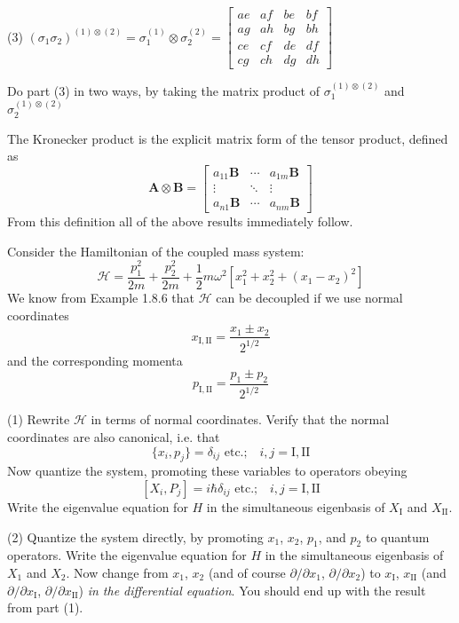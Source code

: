 \documentclass[../principles-of-quantum-mechanics.tex]{subfiles}
\begin{document}
\begin{questions}
		(3) $(\sigma_1\sigma_2)^{(1)\otimes(2)} = \sigma_1^{(1)}\otimes\sigma_2^{(2)} = \begin{bmatrix}ae & af & be & bf \\ ag & ah & bg & bh \\ ce & cf & de & df \\ cg & ch & dg & dh\end{bmatrix}$
		
		Do part (3) in two ways, by taking the matrix product of $\sigma_1^{(1)\otimes(2)}$ and $\sigma_2^{(1)\otimes(2)}$
		
		\begin{solution}
			The Kronecker product is the explicit matrix form of the tensor product, defined as
			$$\mathbf{A}\otimes\mathbf{B} = \begin{bmatrix}a_{11}\mathbf{B} & \cdots & a_{1m}\mathbf{B} \\ \vdots & \ddots & \vdots \\ a_{n1}\mathbf{B} & \cdots & a_{nm}\mathbf{B}\end{bmatrix}$$
			From this definition all of the above results immediately follow.
		\end{solution}
	
		\question Consider the Hamiltonian of the coupled mass system:
		$$\mathcal{H} = \frac{p_1^2}{2m} + \frac{p_2^2}{2m} + \frac{1}{2}m\omega^2[x_1^2 + x_2^2 + (x_1 - x_2)^2]$$
		We know from Example 1.8.6 that $\mathcal{H}$ can be decoupled if we use normal coordinates
		$$x_{\mathrm{I}, \mathrm{II}} = \frac{x_1 \pm x_2}{2^{1/2}}$$
		and the corresponding momenta
		$$p_{\mathrm{I}, \mathrm{II}} = \frac{p_1 \pm p_2}{2^{1/2}}$$
		
		(1) Rewrite $\mathcal{H}$ in terms of normal coordinates. Verify that the normal coordinates are also canonical, i.e. that
		$$\{x_i, p_j\} = \delta_{ij}\text{ etc.;}\quad i, j = \mathrm{I}, \mathrm{II}$$
		Now quantize the system, promoting these variables to operators obeying
		$$[X_i, P_j] = i\hbar\delta_{ij}\text{ etc.;}\quad i, j = \mathrm{I},\mathrm{II}$$
		Write the eigenvalue equation for $H$ in the simultaneous eigenbasis of $X_{\mathrm{I}}$ and $X_{\mathrm{II}}$.
		
		(2) Quantize the system directly, by promoting $x_1$, $x_2$, $p_1$, and $p_2$ to quantum operators. Write the eigenvalue equation for $H$ in the simultaneous eigenbasis of $X_1$ and $X_2$. Now change from $x_1$, $x_2$ (and of course $\partial/\partial x_1$, $\partial/\partial x_2$) to $x_\mathrm{I}$, $x_\mathrm{II}$ (and $\partial/\partial x_\mathrm{I}$, $\partial/\partial x_\mathrm{II}$) \textit{in the differential equation}. You should end up with the result from part (1).
		

\end{questions}
\end{document}
